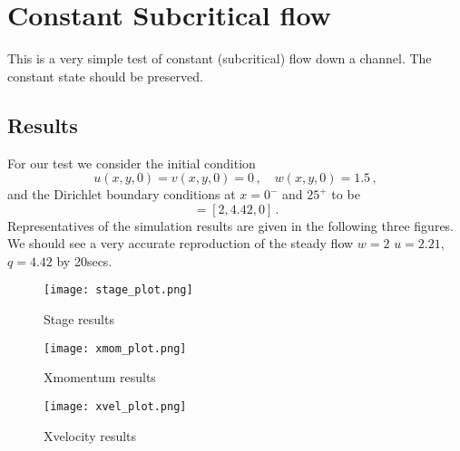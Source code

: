 
\section{Constant Subcritical flow}

This is a very simple test of constant (subcritical) flow down a channel. The constant state should be preserved. 


\subsection{Results}
For our test we consider the initial condition
\begin{equation}
u(x,y,0)=v(x,y,0)=0\,, \quad
w(x,y,0)= 1.5\,,
\end{equation}
and the Dirichlet boundary conditions at $x=0^{-}$ and $25^{+}$ to be 
\begin{equation}
[w,hu,hv]=[2, 4.42, 0]\,.
\end{equation}
Representatives of the simulation results are given in the following three figures. 
We should see a very accurate reproduction of the steady flow $w=2$ $u=2.21$, $q=4.42$ by 20secs. 

\begin{figure}
\begin{center}
\texttt{[image: stage\_plot.png]}
\end{center}
\caption{Stage results}
\end{figure}


\begin{figure}
\begin{center}
\texttt{[image: xmom\_plot.png]}
\end{center}
\caption{Xmomentum results}
\end{figure}


\begin{figure}
\begin{center}
\texttt{[image: xvel\_plot.png]}
\end{center}
\caption{Xvelocity results}
\end{figure}


\endinput
